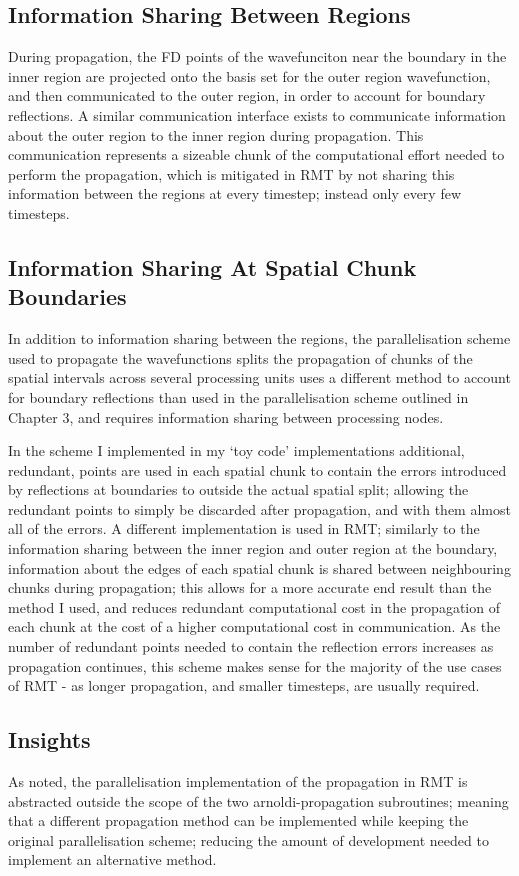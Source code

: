 \subsection{Information Sharing Between Regions}
During propagation, the FD points of the wavefunciton near the boundary in the inner region are projected onto the basis set for the outer region wavefunction, and then communicated to the outer region, in order to account for boundary reflections. A similar communication interface exists to communicate information about the outer region to the inner region during propagation. This communication represents a sizeable chunk of the computational effort needed to perform the propagation, which is mitigated in RMT by not sharing this information between the regions at every timestep; instead only every few timesteps.

\subsection{Information Sharing At Spatial Chunk Boundaries}
In addition to information sharing between the regions, the parallelisation scheme used to propagate the wavefunctions splits the propagation of chunks of the spatial intervals across several processing units uses a different method to account for boundary reflections than used in the parallelisation scheme outlined in Chapter 3, and requires information sharing between processing nodes. 

In the scheme I implemented in my `toy code' implementations additional, redundant, points are used in each spatial chunk to contain the errors introduced by reflections at boundaries to outside the actual spatial split; allowing the redundant points to simply be discarded after propagation, and with them almost all of the errors. A different implementation is used in RMT; similarly to the information sharing between the inner region and outer region at the boundary, information about the edges of each spatial chunk is shared between neighbouring chunks during propagation; this allows for a more accurate end result than the method I used, and reduces redundant computational cost in the propagation of each chunk at the cost of a higher computational cost in communication. As the number of redundant points needed to contain the reflection errors increases as propagation continues, this scheme makes sense for the majority of the use cases of RMT - as longer propagation, and smaller timesteps, are usually required.

\subsection{Insights}
As noted, the parallelisation implementation of the propagation in RMT is abstracted outside the scope of the two arnoldi-propagation subroutines; meaning that a different propagation method can be implemented while keeping the original parallelisation scheme; reducing the amount of development needed to implement an alternative method. 

